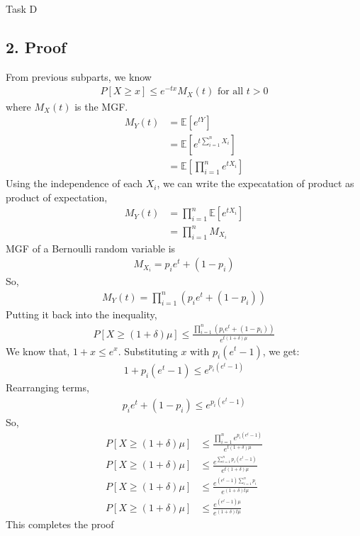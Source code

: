 \begin{task}{Task D}
	\subsection*{2. Proof}
	From previous subparts, we know
	\begin{align}
		P[X\geq x]\leq e^{-tx}M_X(t) \text{ for all } t>0
	\end{align}
	where $M_X(t)$ is the MGF.
	\begin{align}
		M_Y(t) & = \mathds{E}[e^{tY}]                             \\
		       & = \mathds{E}[e^{t\sum_{i=1}^{n}X_i}]             \\
		       & = \mathds{E}\left[\prod_{i=1}^{n}e^{tX_i}\right]
	\end{align}
	Using the independence of each $X_i$, we can write the expecatation of product as product of expectation,
	\begin{align}
		M_Y(t) & = \prod_{i=1}^{n}\mathds{E}[e^{tX_i}] \\
		       & = \prod_{i=1}^{n}M_{X_i}
	\end{align}
	MGF of a Bernoulli random variable is
	\begin{align}
		M_{X_i} = p_ie^t+(1-p_i)
	\end{align}
	So,
	\begin{align}
		M_Y(t) = \prod_{i=1}^{n}(p_ie^t+(1-p_i))
	\end{align}
	Putting it back into the inequality,
	\begin{align}
		P[X\geq (1+\delta)\mu]\leq \frac{\prod_{i=1}^{n}(p_ie^t+(1-p_i))}{e^{t(1+\delta)\mu}}
	\end{align}
	We know that, $1+x \leq e^x$. Substituting $x$ with $p_i(e^t-1)$, we get:
	\begin{align}
		1+p_i(e^t-1) \leq e^{p_i(e^t-1)}
	\end{align}
	Rearranging terms,
	\begin{align}
		p_ie^t + (1-p_i) \leq e^{p_i(e^t-1)}
	\end{align}
	So,
	\begin{align}
		P[X\geq (1+\delta)\mu] & \leq \frac{\prod_{i=1}^{n}e^{p_i(e^t-1)}}{e^{t(1+\delta)\mu}} \\
		P[X\geq (1+\delta)\mu] & \leq \frac{e^{\sum_{i=1}^{n}p_i(e^t-1)}}{e^{t(1+\delta)\mu}}  \\
		P[X\geq (1+\delta)\mu] & \leq \frac{e^{(e^t-1)\sum_{i=1}^{n}p_i}}{e^{(1+\delta)t\mu}}  \\
		P[X\geq (1+\delta)\mu] & \leq \frac{e^{(e^t-1)\mu}}{e^{(1+\delta)t\mu}}
		\label{en:q4dineq}
	\end{align}
	This completes the proof

\end{task}

